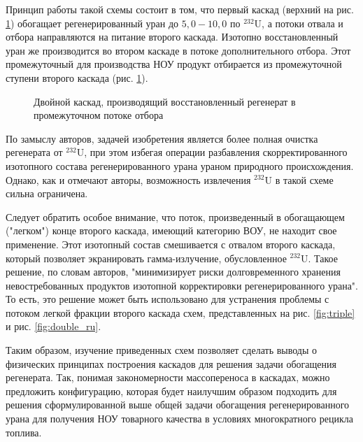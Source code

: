 Принцип работы такой схемы состоит в том, что первый каскад (верхний на рис. \ref{fig:double_crazy}) обогащает регенерированный уран до $5,0-10,0$ по $^{232}$U, а потоки отвала и отбора направляются на питание второго каскада.
Изотопно восстановленный уран же производится во втором каскаде в потоке дополнительного отбора.
Этот промежуточный для производства НОУ продукт отбирается из промежуточной ступени второго каскада (рис. \ref{fig:double_crazy}).
\begin{figure}[ht]
  \caption{Двойной каскад, производящий восстановленный регенерат в промежуточном потоке отбора}\label{fig:double_crazy}
\end{figure}

По замыслу авторов, задачей изобретения является более полная очистка регенерата от $^{232}$U, при этом избегая операции разбавления скорректированного изотопного состава регенерированного урана ураном природного происхождения.
Однако, как и отмечают авторы, возможность извлечения $^{232}$U в такой схеме сильна ограничена.

Следует обратить особое внимание, что поток, произведенный в обогащающем ("легком") конце второго каскада, имеющий категорию ВОУ, не находит свое применение.
Этот изотопный состав смешивается с отвалом второго каскада, который позволяет экранировать гамма-излучение, обусловленное $^{232}$U.
Такое решение, по словам авторов, "минимизирует риски долговременного хранения невостребованных продуктов изотопной корректировки регенерированного урана".
То есть, это решение может быть использовано для устранения проблемы с потоком легкой фракции второго каскада схем, представленных на рис. \ref{fig:triple} и рис. \ref{fig:double_ru}.


Таким образом, изучение приведенных схем позволяет сделать выводы о физических принципах построения каскадов для решения задачи обогащения регенерата. 
Так, понимая закономерности массопереноса в каскадах, можно предложить конфигурацию, которая будет наилучшим образом подходить для решения сформулированной выше общей задачи обогащения регенерированного урана для получения НОУ товарного качества в условиях многократного рецикла топлива.

